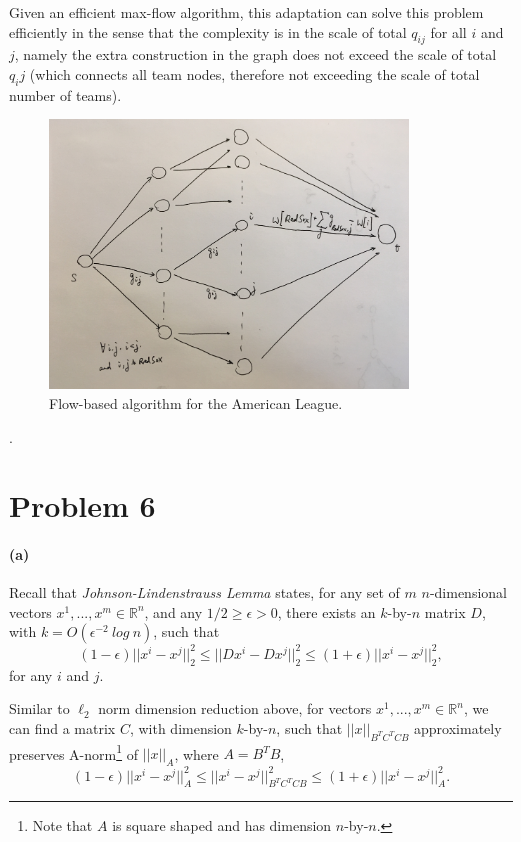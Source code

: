 \documentclass[12pt]{article}
\begin{document}
Given an efficient max-flow algorithm, this adaptation can solve this problem efficiently in the sense that the complexity is in the scale of total $q_{ij}$ for all $i$ and $j$, namely the extra construction in the graph does not exceed the scale of total $q_ij$ (which connects all team nodes, therefore not exceeding the scale of total number of teams).

\begin{figure}
	\centering
	\includegraphics[width=0.85\textwidth]{5.jpg}
	\caption{Flow-based algorithm for the American League.} \label{fig:5}
\end{figure}

\pagebreak
.
\pagebreak

\section*{Problem 6}
\paragraph{(a)}
Recall that \emph{Johnson-Lindenstrauss Lemma} states, for any set of $m$ $n$-dimensional vectors $x^1, ..., x^m \in \mathbb{R}^n$, and any $1/2 \geq \epsilon >0$, there exists an $k$-by-$n$ matrix $D$, with $k = O(\epsilon^{-2}\:log\:n)$, such that 
\begin{equation*}
(1-\epsilon) ||x^i - x^j||^2_2 \leq ||D x^i - D x^j||^2_2 \leq (1+\epsilon) ||x^i - x^j||^2_2,
\end{equation*}
for any $i$ and $j$.

Similar to $\ell_2$ norm dimension reduction above, for vectors $x^1, ..., x^m \in \mathbb{R}^n$, we can find a matrix $C$, with dimension $k$-by-$n$, such that $||x||_{B^TC^TCB}$ approximately preserves A-norm\footnote{Note that $A$ is square shaped and has dimension $n$-by-$n$.} of $||x||_A$, where $A=B^TB$, 
\begin{equation*}
(1-\epsilon) ||x^i - x^j||^2_A \leq ||x^i - x^j||^2_{B^TC^TCB} \leq (1+\epsilon) ||x^i - x^j||^2_A.
\end{equation*}
\end{document}
